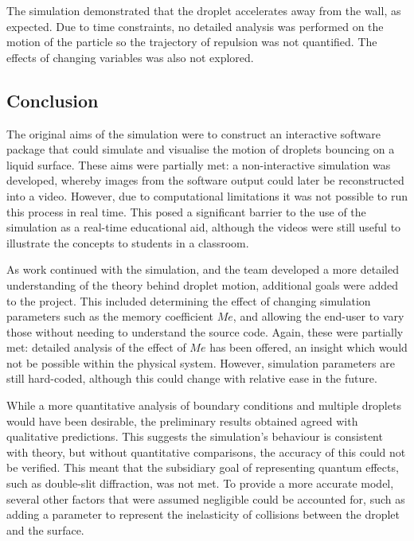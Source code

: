 The simulation demonstrated that the droplet accelerates away from the wall, as expected. Due to time constraints, no detailed analysis was performed on the motion of the particle so the trajectory of repulsion was not quantified. The effects of changing variables was also not explored.


\subsection{Conclusion}

The original aims of the simulation were to construct an interactive software package that could simulate and visualise the motion of droplets bouncing on a liquid surface. These aims were partially met: a non-interactive simulation was developed, whereby images from the software output could later be reconstructed into a video. However, due to computational limitations it was not possible to run this process in real time. This posed a significant barrier to the use of the simulation as a real-time educational aid, although the videos were still useful to illustrate the concepts to students in a classroom.

As work continued with the simulation, and the team developed a more detailed understanding of the theory behind droplet motion, additional goals were added to the project. This included determining the effect of changing simulation parameters such as the memory coefficient $Me$, and allowing the end-user to vary those without needing to understand the source code. Again, these were partially met: detailed analysis of the effect of $Me$ has been offered, an insight which would not be possible within the physical system. However, simulation parameters are still hard-coded, although this could change with relative ease in the future.

While a more quantitative analysis of boundary conditions and multiple droplets would have been desirable, the preliminary results obtained agreed with qualitative predictions. This suggests the simulation's behaviour is consistent with theory, but without quantitative comparisons, the accuracy of this could not be verified. This meant that the subsidiary goal of representing quantum effects, such as double-slit diffraction, was not met. To provide a more accurate model, several other factors that were assumed negligible could be accounted for, such as adding a parameter to represent the inelasticity of collisions between the droplet and the surface.